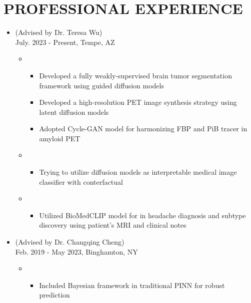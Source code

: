 \documentclass[10pt]{article}
\begin{document}
\section*{PROFESSIONAL EXPERIENCE}
\begin{itemize}
	\item {} (Advised by Dr. Teresa Wu)\\
        \hfill{July. 2023 - Present, Tempe, AZ}
        \begin{itemize}[label=$\bullet$]
            \item {}
            \begin{itemize}[label=$-$]
				\item Developed a fully weakly-supervised brain tumor segmentation framework using guided diffusion models
				\item Developed a high-resolution PET image synthesis strategy using latent diffusion models
				\item Adopted Cycle-GAN model for harmonizing FBP and PiB tracer in amyloid PET
			\end{itemize}

            
            \item {}
            \begin{itemize}[label=$-$]
				\item Trying to utilize diffusion models as interpretable medical image classifier with conterfactual 
			\end{itemize}
            \item {}
            \begin{itemize}[label=$-$]
				\item Utilized BioMedCLIP model for in headache diagnosis and subtype discovery using patient's MRI and clinical notes
			\end{itemize}
        \end{itemize}
        
        
	\item {} (Advised by Dr. Changqing Cheng)\\
	\hfill{Feb. 2019 - May 2023, Binghamton, NY}
	\begin{itemize}[label=$\bullet$]
	
	    \item {}
		\begin{itemize}[label=$-$]
	        \item Included Bayesian framework in traditional PINN for robust prediction
		\end{itemize}
		

\end{itemize}
\end{itemize}
\end{document}
